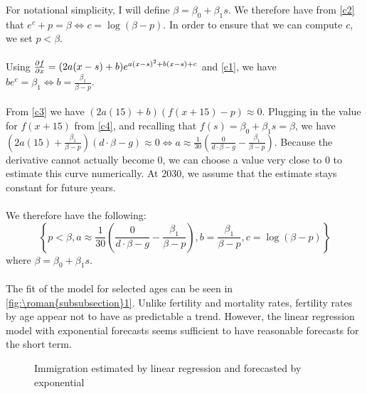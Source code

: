 \documentclass{article}
\renewcommand{\thesubsubsection}{\roman{subsubsection}}
\numberwithin{equation}{subsection}
\newcommand*{\FigureDir}{../../graphs}
\begin{document}
\begin{appendices}
\noindent
For notational simplicity, I will define \(\beta = \beta_0 + \beta_1s\). We therefore have from \ref{c2} that \(e^c + p = \beta \Leftrightarrow c = \log(\beta - p)\). In order to ensure that we can compute \(c\), we set \(p < \beta\).
\\\\
Using \(\pdv{f}{x} = (2a(x-s) + b)e^{a(x-s)^2 + b(x-s) + c}\) and \ref{c1}, we have \(be^c = \beta_1 \Leftrightarrow b = \frac{\beta_1}{\beta - p}\).
\\\\
From \ref{c3} we have \((2a(15) + b)(f(x+15) - p) \approx 0\). Plugging in the value for \(f(x+15)\) from \ref{c4}, and recalling that \(f(s) = \beta_0 + \beta_1s = \beta\), we have \(\left(2a(15) + \frac{\beta_1}{\beta - p}\right)(d\cdot \beta - g) \approx 0 \Leftrightarrow a \approx \frac{1}{30}\left(\frac{0}{d\cdot\beta-g} - \frac{\beta_1}{\beta - p}\right)\). Because the derivative cannot actually become 0, we can choose a value very close to 0 to estimate this curve numerically. At 2030, we assume that the estimate stays constant for future years.
\\\\
We therefore have the following:
\[
   \left\{
      p < \beta,
      a \approx \frac{1}{30}\left(\frac{0}{d\cdot\beta - g} - \frac{\beta_1}{\beta - p}\right),
      b = \frac{\beta_1}{\beta - p},
      c = \log(\beta - p)
   \right\}
\]
\noindent
where \(\beta = \beta_0 + \beta_1s\).
\\\\
The fit of the model for selected ages can be seen in \autoref{fig:\thesubsubsection1}. Unlike fertility and mortality rates, fertility rates by age appear not to have as predictable a trend. However, the linear regression model with exponential forecasts seems sufficient to have reasonable forecasts for the short term.

\begin{figure}[H]
   \centering
   \caption{\label{fig:\thesubsubsection1}Immigration estimated by linear regression and forecasted by exponential}
\end{figure}


\end{appendices}
\end{document}

